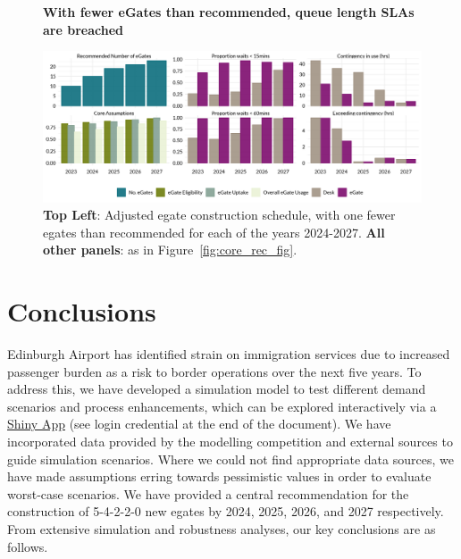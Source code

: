 \documentclass[10pt]{article}
\newcommand*{\figuretitle}[1]{%
    {\centering%
    \textbf{#1}%
    \par\medskip}%
}
\begin{document}
\begin{figure}[!t]
    \centering
    \figuretitle{With fewer eGates than recommended, queue length SLAs are breached}
    \includegraphics[width=\textwidth]{figures/minus_core_rec_fig.png}
     \caption{\textbf{Top Left}: Adjusted \gls{egate} construction schedule, with one fewer \glspl{egate} than recommended for each of the years 2024-2027. \textbf{All other panels}: as in Figure~\ref{fig:core_rec_fig}.} \label{fig:minus_core_rec_fig}
\end{figure}




\section{Conclusions}
Edinburgh Airport has identified strain on immigration services due to increased passenger burden as a risk to border operations over the next five years. To address this, we have developed a simulation model to test different demand scenarios and process enhancements, which can be explored interactively via a \href{https://jacob-bradley.shinyapps.io/shiny/}{Shiny App} (see login credential at the end of the document). We have incorporated data provided by the modelling competition and external sources to guide simulation scenarios. Where we could not find appropriate data sources, we have made assumptions erring towards pessimistic values in order to evaluate worst-case scenarios. We have provided a central recommendation for the construction of 5-4-2-2-0 new \glspl{egate} by 2024, 2025, 2026, and 2027 respectively. From extensive simulation and robustness analyses, our key conclusions are as follows.
\end{document}

